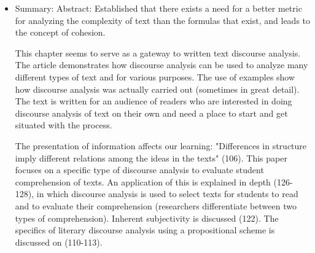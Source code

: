 \documentclass{TC}
\begin{document}
\begin{itemize}
\item Summary: Abstract:
Established that there exists a need for a better metric for analyzing the complexity of text than the formulas that exist, and leads to the concept of cohesion.

This chapter seems to serve as a gateway to written text discourse analysis. The article demonstrates how discourse analysis can be used to analyze many different types of text and for various purposes. The use of examples show how discourse analysis was actually carried out (sometimes in great detail). The text is written for an audience of readers who are interested in doing discourse analysis of text on their own and need a place to start and get situated with the process.

The presentation of information affects our learning: "Differences in structure imply different relations among the ideas in the texts" (106). This paper focuses on a specific type of discourse analysis to evaluate student comprehension of texts. An application of this is explained in depth (126-128), in which discourse analysis is used to select texts for students to read and to evaluate their comprehension (researchers differentiate between two types of comprehension). Inherent subjectivity is discussed (122). The specifics of literary discourse analysis using a propositional scheme is discussed on (110-113).


\end{itemize}
\end{document}
